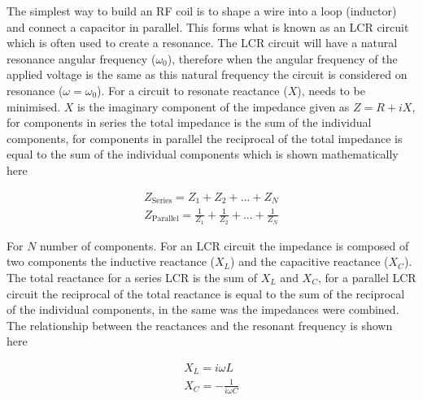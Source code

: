 
The simplest way to build an \ac{RF} coil is to shape a wire into a loop (inductor) and connect a capacitor in parallel. This forms what is known as an LCR circuit which is often used to create a resonance. The LCR circuit will have a natural resonance angular frequency ($\omega_0$), therefore when the angular frequency of the applied voltage is the same as this natural frequency the circuit is considered on resonance ($\omega=\omega_0$). For a circuit to resonate reactance ($X$), needs to be minimised. $X$ is the imaginary component of the impedance given as $Z = R+iX$, for components in series the total impedance is the sum of the individual components, for components in parallel the reciprocal of the total impedance is equal to the sum of the individual components which is shown mathematically here 

\begin{equation}
    \begin{gathered}
        Z_\text{Series} = Z_1 + Z_2 + ... + Z_N \\
        Z_\text{Parallel} = \frac{1}{Z_1} + \frac{1}{Z_2} + ... + \frac{1}{Z_N}
    \end{gathered}
\end{equation}

For $N$ number of components. For an LCR circuit the impedance is composed of two components the inductive reactance ($X_L$) and the capacitive reactance ($X_C$). The total reactance for a series LCR is the sum of $X_L$ and $X_C$, for a parallel LCR circuit the reciprocal of the total reactance is equal to the sum of the reciprocal of the individual components, in the same was the impedances were combined. The relationship between the reactances and the resonant frequency is shown here

\begin{equation}
\begin{gathered}
    X_L = i\omega L \\
    X_C = -\frac{1}{i\omega C}
    \label{eqn:coils:X}
\end{gathered}
\end{equation}

